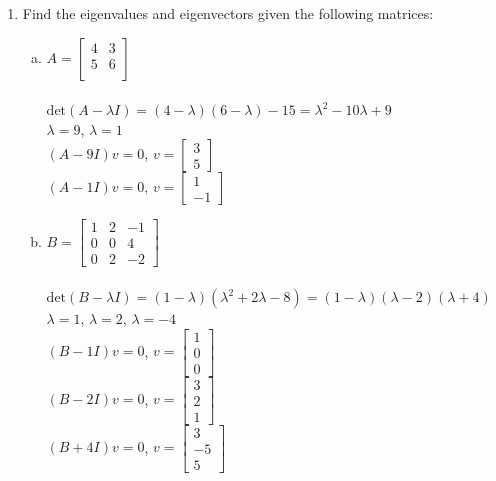 \documentclass{article}
\begin{document}
{{\begin{enumerate}
\newpage\item Find the eigenvalues and eigenvectors given the following matrices:
\begin{enumerate}[a.]
\item $A= \left[
\begin{array}{cc}
4 & 3 \\
5 & 6 \\
\end{array} \right] $
\\
\\$\textrm{det}(A-\lambda I)=(4-\lambda)(6-\lambda)-15=\lambda^2-10\lambda+9$
\\$\lambda=9$, $\lambda=1$
\\$(A-9I)v=0$, $v=\left[\begin{array}{c}3\\5\end{array}\right]$
\\$(A-1I)v=0$, $v=\left[\begin{array}{c}1\\-1\end{array}\right]$
\\
\item $B= \left[
\begin{array}{ccc}
1 & 2 & -1 \\
0 & 0 & 4 \\
0 & 2 & -2
\end{array} \right] $
\\
\\$\textrm{det}(B-\lambda I)=(1-\lambda)(\lambda^2+2\lambda-8)=(1-\lambda)(\lambda-2)(\lambda+4)$
\\$\lambda=1$, $\lambda=2$, $\lambda=-4$
\\$(B-1I)v=0$, $v=\left[\begin{array}{c}1\\0\\0\end{array}\right]$
\\$(B-2I)v=0$, $v=\left[\begin{array}{c}3\\2\\1\end{array}\right]$
\\$(B+4I)v=0$, $v=\left[\begin{array}{c}3\\-5\\5\end{array}\right]$
\end{enumerate}



\end{enumerate}}}
\end{document}
